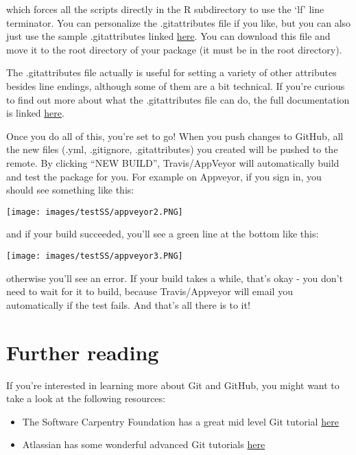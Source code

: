 \documentclass[
]{book}
\begin{document}
which forces all the scripts directly in the R subdirectory to use the `lf' line terminator. You can personalize the .gitattributes file if you like, but you can also just use the sample .gitattributes linked \href{https://GitHub.com/krlmlr/r-appveyor/blob/master/.gitattributes}{here}. You can download this file and move it to the root directory of your package (it must be in the root directory).

The .gitattributes file actually is useful for setting a variety of other attributes besides line endings, although some of them are a bit technical. If you're curious to find out more about what the .gitattributes file can do, the full documentation is linked \href{https://git-scm.com/docs/gitattributes}{here}.

Once you do all of this, you're set to go! When you push changes to GitHub, all the new files (.yml, .gitignore, .gitattributes) you created will be pushed to the remote. By clicking ``NEW BUILD'', Travis/AppVeyor will automatically build and test the package for you. For example on Appveyor, if you sign in, you should see something like this:

\texttt{[image: images/testSS/appveyor2.PNG]}

and if your build succeeded, you'll see a green line at the bottom like this:

\texttt{[image: images/testSS/appveyor3.PNG]}

otherwise you'll see an error. If your build takes a while, that's okay - you don't need to wait for it to build, because Travis/Appveyor will email you automatically if the test fails. And that's all there is to it!

\hypertarget{further-reading}{%
\section{Further reading}\label{further-reading}}

If you're interested in learning more about Git and GitHub, you might want to take a look at the following resources:

\begin{itemize}
\item
  The Software Carpentry Foundation has a great mid level Git tutorial \href{https://swcarpentry.GitHub.io/git-novice/}{here}
\item
  Atlassian has some wonderful advanced Git tutorials \href{https://www.atlassian.com/git/tutorials/advanced-overview}{here}
\end{itemize}
\end{document}
